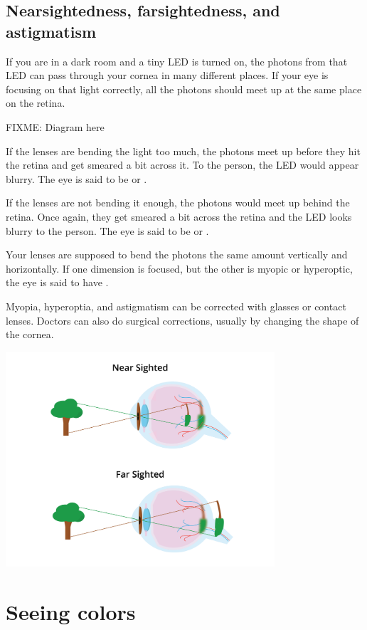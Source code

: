 \subsection{Nearsightedness, farsightedness, and astigmatism}

If you are in a dark room and a tiny LED is turned on, the photons
from that LED can pass through your cornea in many different places.
If your eye is focusing on that light correctly, all the photons
should meet up at the same place on the retina.

FIXME: Diagram here

If the lenses are bending the light too much, the photons meet up before they hit the
retina and get smeared a bit across it. To the person, the LED
would appear blurry. The eye is said to be  or
.

If the lenses are not bending it enough, the photons would meet up
behind the retina.  Once again, they get smeared a bit across the
retina and the LED looks blurry to the person. The eye is said to be
 or .

Your lenses are supposed to bend the photons the same amount
vertically and horizontally. If one dimension is focused, but the
other is myopic or hyperoptic, the eye is said to have .

Myopia, hyperoptia, and astigmatism can be corrected with glasses or contact
lenses. Doctors can also do surgical corrections, usually by changing
the shape of the cornea.

\includegraphics[width=0.75\textwidth]{nearfarSight.png}

\section{Seeing colors}

